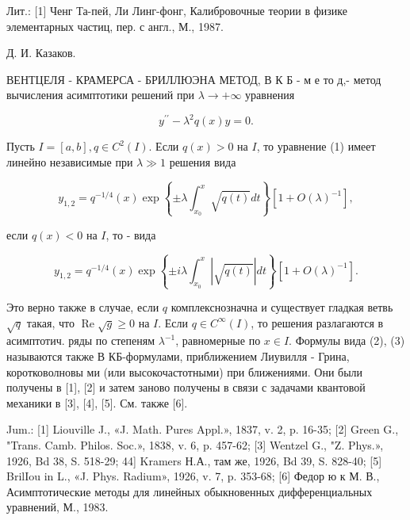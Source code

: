 \documentclass[10pt]{article}
\begin{document}
Лит.: [1] Ченг Та-пей, Ли Линг-фонг, Калибровочные теории в физике элементарных частиц, пер. с англ., М., 1987.



Д. И. Казаков.



ВЕНТЦЕЛЯ - КРАМЕРСА - БРИЛЛЮЭНА МЕТОД, В К Б - м е то д,- метод вычисления асимптотики решений при $\lambda \rightarrow+\infty$ уравнения



\[

y^{\prime \prime}-\lambda^{2} q(x) y=0 .

\]



Пусть $I=[a, b], q \in C^{2}(I)$. Если $q(x)>0$ на $I$, то уравнение (1) имеет линейно независимые при $\lambda \gg 1$ решения вида



\[

y_{1,2}=q^{-1 / 4}(x) \exp \left\{ \pm \lambda \int_{x_{0}}^{x} \sqrt{q(t)} d t\right\}\left[1+O(\lambda)^{-1}\right],

\]



если $q(x)<0$ на $I$, то - вида



\[

y_{1,2}=q^{-1 / 4}(x) \exp \left\{ \pm i \lambda \int_{x_{0}}^{x}|\sqrt{q(t)}| d t\right\}\left[1+O(\lambda)^{-1}\right] .

\]



Это верно также в случае, если $q$ комплекснозначна и существует гладкая ветвь $\sqrt{q}$ такая, что $\operatorname{Re} \sqrt{g} \geqslant 0$ на $I$. Если $q \in C^{\infty}(I)$, то решения разлагаются в асимптотич. ряды по степеням $\lambda^{-1}$, равномерные по $x \in I$. Формулы вида (2), (3) называются также В КБ-формулами, приближением Лиувилля - Грина, коротковолновы ми (или высокочастотными) при ближениями. Они были получены в [1], [2] и затем заново получены в связи с задачами квантовой механики в [3], [4], [5]. См. также [6].



Jum.: [1] Liouville J., «J. Math. Pures Appl.», 1837, v. 2, p. 16-35; [2] Green G., "Trans. Camb. Philos. Soc.», 1838, v. 6, p. 457-62; [3] Wentzel G., "Z. Phys.», 1926, Bd 38, S. 518-29; 44] Kramers Н.А., там же, 1926, Bd 39, S. 828-40; [5] BrilIou in L., «J. Phys. Radium», 1926, v. 7, p. 353-68; [6] Федор ю к М. В., Асимптотические методы для линейных обыкновенных дифференциальных уравнений, М., 1983.
\end{document}
